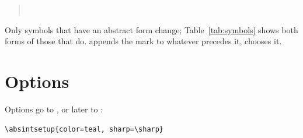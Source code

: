 \documentclass[11pt,a4paper]{article}
\newcommand*\cs[1]{\blatex{\\#1}}
\newcommand*\opt[1]{\blatex{#1}}
\begin{document}
\begin{quote}
  \\
\end{quote}

Only symbols that have an abstract form change; Table~\ref{tab:symbols} shows
both forms of those that do.  \cs{isAbstract} appends the mark to whatever
precedes it, \opt{sharp} chooses it.

\section{Options}\label{sec:options}

Options go to \cs{usepackage}, or later to \cs{absintsetup}:

\begin{verbatim}
\absintsetup{color=teal, sharp=\sharp}
\end{verbatim}
\end{document}
